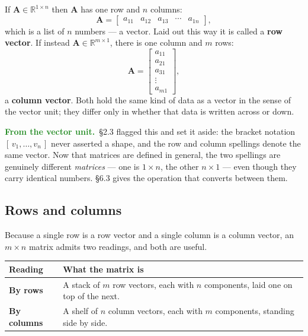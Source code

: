 \documentclass[11pt]{article}
\theoremstyle{plain}
\theoremstyle{definition}
\theoremstyle{remark}
\newcommand{\lookback}{\par\smallskip\noindent
  \textbf{\sffamily\textcolor{ForestGreen}{From the vector unit.}}\ \ignorespaces}
\newcommand{\R}{\mathbb{R}}
\newcommand{\mt}[1]{\mathbf{#1}}        %
\begin{document}
If $\mt{A}\in\R^{1\times n}$ then $\mt{A}$ has one row and $n$ columns:
\[
  \mt{A}=\begin{bmatrix}a_{11}&a_{12}&a_{13}&\cdots&a_{1n}\end{bmatrix} ,
\]
which is a list of $n$ numbers --- a vector. Laid out this way it is called a
\textbf{row vector}. If instead $\mt{A}\in\R^{m\times1}$, there is one column
and $m$ rows:
\[
  \mt{A}=\begin{bmatrix}a_{11}\\a_{21}\\a_{31}\\\vdots\\a_{m1}\end{bmatrix} ,
\]
a \textbf{column vector}. Both hold the same kind of data as a vector in the
sense of the vector unit; they differ only in whether that data is written
across or down.

\lookback \S2.3 flagged this and set it aside: the bracket notation
$[\,v_1,\dots,v_n\,]$ never asserted a shape, and the row and column spellings
denote the same vector. Now that matrices are defined in general, the two
spellings are genuinely different \emph{matrices} --- one is $1\times n$, the
other $n\times1$ --- even though they carry identical numbers. \S6.3 gives the
operation that converts between them.

\subsection{Rows and columns}
Because a single row is a row vector and a single column is a column vector,
an $m\times n$ matrix admits two readings, and both are useful.

\begin{center}
\renewcommand{\arraystretch}{1.3}
\begin{tabular}{@{}l p{10.4cm}@{}}
\toprule
\textbf{Reading} & \textbf{What the matrix is} \\
\midrule
\textbf{By rows}    & A stack of $m$ row vectors, each with $n$ components,
                      laid one on top of the next. \\
\textbf{By columns} & A shelf of $n$ column vectors, each with $m$ components,
                      standing side by side. \\
\bottomrule
\end{tabular}
\end{center}
\end{document}
